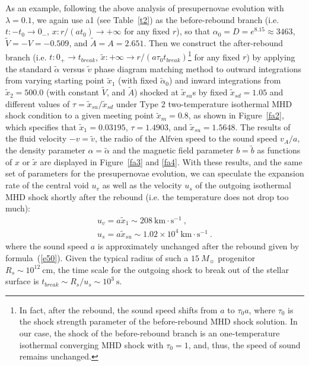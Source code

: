 \documentclass[fleqn,usenatbib]{mnras}
\begin{document}
As an example, following the above analysis of presupernovae evolution with $\lambda=0.1$, we again use a1 (see Table~\ref{t2}) as the before-rebound branch (i.e. $t:-t_{0}\rightarrow 0_{-}$, $x:r/\left(at_{0}\right)\rightarrow +\infty$ for any fixed $r$), so that $\alpha_{0}=D=e^{8.15}\approx 3463$, $\widetilde{V}=-V=-0.509$, and $\widetilde{A}=A=2.651$. Then we construct the after-rebound branch (i.e. $t:0_{+}\rightarrow t_{break}$, $\widetilde{x}:+\infty\rightarrow r/\left(a\tau_{0}t_{break}\right)$\footnote{In fact, after the rebound, the sound speed shifts from $a$ to $\tau_{0} a$, where $\tau_{0}$ is the shock strength parameter of the before-rebound MHD shock solution. In our case, the shock of the before-rebound branch is an one-temperature isothermal converging MHD shock with $\tau_{0}=1$, and, thus, the speed of sound remains unchanged.} for any fixed $r$) by applying the standard $\widetilde{\alpha}$ versus $\widetilde{v}$ phase diagram matching method to outward integrations from varying starting point $\widetilde{x}_{1}$ (with fixed $\widetilde{\alpha}_{0}$) and inward integrations from $\widetilde{x}_{2}=500.0$ (with constant $\widetilde{V}$, and $\widetilde{A}$) shocked at $\widetilde{x}_{su}$s by fixed $\widetilde{x}_{sd}=1.05$ and different values of $\tau=\widetilde{x}_{su}/\widetilde{x}_{sd}$ under Type 2 two-temperature isothermal MHD shock condition to a given meeting point $\widetilde{x}_{m}=0.8$, as shown in Figure~\ref{fa2}, which specifies that $\widetilde{x}_{1}=0.03195$, $\tau=1.4903$, and $\widetilde{x}_{su}=1.5648$. The results of the fluid velocity $-v=\widetilde{v}$, the radio of the $\text{Alfv}\mathrm{\acute{e}}\text{n}$ speed to the sound speed $v_{A}/a$, the density parameter $\alpha=\widetilde{\alpha}$ and the magnetic field parameter $b=\widetilde{b}$ as functions of $x$ or $\widetilde{x}$ are displayed in Figure~\ref{fa3} and \ref{fa4}. With these results, and the same set of parameters for the presupernovae evolution, we can speculate the expansion rate of the central void $u_{v}$ as well as the velocity $u_{s}$ of the outgoing isothermal MHD shock shortly after the rebound (i.e. the temperature does not drop too much):
\begin{gather}
u_{v}=a\widetilde{x}_{1}\sim 208~\mathrm{km\cdot s^{-1}}\ ,\\
u_{s}=a\widetilde{x}_{su}\sim 1.02\times 10^{4}~\mathrm{km\cdot s^{-1}}\ .
\end{gather}
where the sound speed $a$ is approximately unchanged after the rebound given by formula~(\ref{e50}). Given the typical radius of such a $15~M_{\sun}$ progenitor $R_{s}\sim 10^{12}~\mathrm{cm}$, the time scale for the outgoing shock to break out of the stellar surface is $t_{break}\sim R_{s}/u_{s}\sim 10^{3}~\mathrm{s}$.
\end{document}
